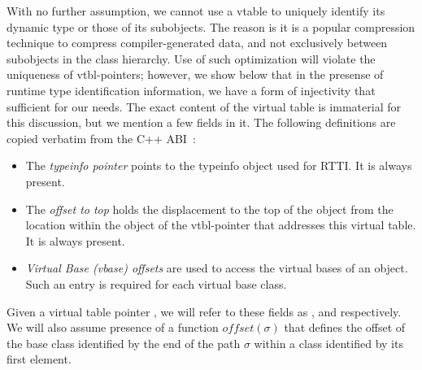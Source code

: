 With no further assumption, we cannot use a vtable to uniquely identify
its dynamic type or those of its subobjects.  The reason is it is a popular 
compression technique to compress compiler-generated data, and not exclusively
between subobjects in the class hierarchy.
Use of such optimization will violate the 
uniqueness of vtbl-pointers; however, we show below that in the presense of 
runtime type identification information, we have a form of injectivity
that sufficient for our needs.
The exact content of the virtual table is immaterial for this discussion, but 
we mention a few fields in it. The following definitions are 
copied verbatim from the C++ ABI~\cite[.2]{C++ABI}:
\begin{itemize}
\setlength{\itemsep}{0pt}
\setlength{\parskip}{0pt}
\item The \emph{typeinfo pointer} points to the typeinfo object used for RTTI. 
      It is always present.  
\item The \emph{offset to top} holds the displacement to the top of the object 
      from the location within the object of the vtbl-pointer that 
      addresses this virtual table. It is always present.
\item \emph{Virtual Base (vbase) offsets} are used to access the virtual bases 
      of an object. Such an entry is required for each virtual base class.
\end{itemize}

\noindent
Given a virtual table pointer , we will refer to these fields as 
,  and  respectively. 
We will also assume presence of a function $offset(\sigma)$ that defines the 
offset of the base class identified by the end of the path $\sigma$ within a 
class identified by its first element.

